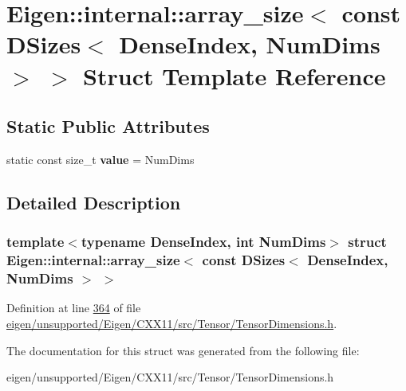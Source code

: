 \hypertarget{struct_eigen_1_1internal_1_1array__size_3_01const_01_d_sizes_3_01_dense_index_00_01_num_dims_01_4_01_4}{}\section{Eigen\+:\+:internal\+:\+:array\+\_\+size$<$ const D\+Sizes$<$ Dense\+Index, Num\+Dims $>$ $>$ Struct Template Reference}
\label{struct_eigen_1_1internal_1_1array__size_3_01const_01_d_sizes_3_01_dense_index_00_01_num_dims_01_4_01_4}
\subsection*{Static Public Attributes}
\begin{DoxyCompactItemize}
\item 
\mbox{\label{struct_eigen_1_1internal_1_1array__size_3_01const_01_d_sizes_3_01_dense_index_00_01_num_dims_01_4_01_4_a6932c387899ab37e06b799d2c1ef72c0}} 
static const size\+\_\+t {\bfseries value} = Num\+Dims
\end{DoxyCompactItemize}


\subsection{Detailed Description}
\subsubsection*{template$<$typename Dense\+Index, int Num\+Dims$>$\newline
struct Eigen\+::internal\+::array\+\_\+size$<$ const D\+Sizes$<$ Dense\+Index, Num\+Dims $>$ $>$}



Definition at line \hyperlink{eigen_2unsupported_2_eigen_2_c_x_x11_2src_2_tensor_2_tensor_dimensions_8h_source_l00364}{364} of file \hyperlink{eigen_2unsupported_2_eigen_2_c_x_x11_2src_2_tensor_2_tensor_dimensions_8h_source}{eigen/unsupported/\+Eigen/\+C\+X\+X11/src/\+Tensor/\+Tensor\+Dimensions.\+h}.



The documentation for this struct was generated from the following file\+:\begin{DoxyCompactItemize}
\item 
eigen/unsupported/\+Eigen/\+C\+X\+X11/src/\+Tensor/\+Tensor\+Dimensions.\+h\end{DoxyCompactItemize}
